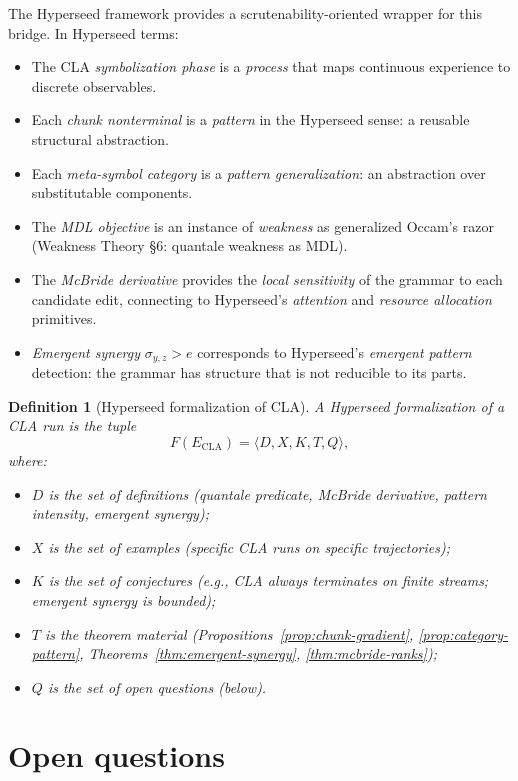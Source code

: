 \documentclass[11pt]{article}
\newtheorem{definition}{Definition}
\begin{document}
The Hyperseed framework provides a scrutenability-oriented wrapper for this bridge.  In Hyperseed terms:

\begin{itemize}
  \item The CLA \emph{symbolization phase} is a \emph{process} that maps continuous experience to discrete observables.
  \item Each \emph{chunk nonterminal} is a \emph{pattern} in the Hyperseed sense: a reusable structural abstraction.
  \item Each \emph{meta-symbol category} is a \emph{pattern generalization}: an abstraction over substitutable components.
  \item The \emph{MDL objective} is an instance of \emph{weakness} as generalized Occam's razor (Weakness Theory \S 6: quantale weakness as MDL).
  \item The \emph{McBride derivative} provides the \emph{local sensitivity} of the grammar to each candidate edit, connecting to Hyperseed's \emph{attention} and \emph{resource allocation} primitives.
  \item \emph{Emergent synergy} $\sigma_{y,z} > e$ corresponds to Hyperseed's \emph{emergent pattern} detection: the grammar has structure that is not reducible to its parts.
\end{itemize}

\begin{definition}[Hyperseed formalization of CLA]
\label{def:hyperseed-cla}
A Hyperseed formalization of a CLA run is the tuple
\[
  F(E_{\text{CLA}}) = \langle D, X, K, T, Q \rangle,
\]
where:
\begin{itemize}
  \item $D$ is the set of definitions (quantale predicate, McBride derivative, pattern intensity, emergent synergy);
  \item $X$ is the set of examples (specific CLA runs on specific trajectories);
  \item $K$ is the set of conjectures (e.g., CLA always terminates on finite streams; emergent synergy is bounded);
  \item $T$ is the theorem material (Propositions~\ref{prop:chunk-gradient}, \ref{prop:category-pattern}, Theorems~\ref{thm:emergent-synergy}, \ref{thm:mcbride-ranks});
  \item $Q$ is the set of open questions (below).
\end{itemize}
\end{definition}

\section{Open questions}
\end{document}

